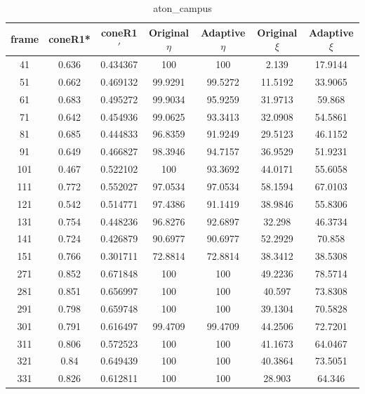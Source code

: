 \begin{appendices}
\begin{table}
\centering
\caption{aton\_campus}
\begin{tabular}{ |c|c|c|c|c|c|c| }
\hline
\textbf{frame} &  \textbf{coneR1*} &  \textbf{coneR1$'$} &  \textbf{Original $\eta$} &  \textbf{Adaptive $\eta$} &  \textbf{Original $\xi$} &  \textbf{Adaptive $\xi$} \\
\hline
\hline
41 &  0.636 &  0.434367 &  100 &  100 &  2.139 &  17.9144 \\
\hline
51 &  0.662 &  0.469132 &  99.9291 &  99.5272 &  11.5192 &  33.9065 \\
\hline
61 &  0.683 &  0.495272 &  99.9034 &  95.9259 &  31.9713 &  59.868 \\
\hline
71 &  0.642 &  0.454936 &  99.0625 &  93.3413 &  32.0908 &  54.5861 \\
\hline
81 &  0.685 &  0.444833 &  96.8359 &  91.9249 &  29.5123 &  46.1152 \\
\hline
91 &  0.649 &  0.466827 &  98.3946 &  94.7157 &  36.9529 &  51.9231 \\
\hline
101 &  0.467 &  0.522102 &  100 &  93.3692 &  44.0171 &  55.6058 \\
\hline
111 &  0.772 &  0.552027 &  97.0534 &  97.0534 &  58.1594 &  67.0103 \\
\hline
121 &  0.542 &  0.514771 &  97.4386 &  91.1419 &  38.9846 &  55.8306 \\
\hline
131 &  0.754 &  0.448236 &  96.8276 &  92.6897 &  32.298 &  46.3734 \\
\hline
141 &  0.724 &  0.426879 &  90.6977 &  90.6977 &  52.2929 &  70.858 \\
\hline
151 &  0.766 &  0.301711 &  72.8814 &  72.8814 &  38.3412 &  38.5308 \\
\hline
271 &  0.852 &  0.671848 &  100 &  100 &  49.2236 &  78.5714 \\
\hline
281 &  0.851 &  0.656997 &  100 &  100 &  40.597 &  73.8308 \\
\hline
291 &  0.798 &  0.659748 &  100 &  100 &  39.1304 &  70.5828 \\
\hline
301 &  0.791 &  0.616497 &  99.4709 &  99.4709 &  44.2506 &  72.7201 \\
\hline
311 &  0.806 &  0.572523 &  100 &  100 &  41.1673 &  64.0467 \\
\hline
321 &  0.84 &  0.649439 &  100 &  100 &  40.3864 &  73.5051 \\
\hline
331 &  0.826 &  0.612811 &  100 &  100 &  28.903 &  64.346 \\

\end{tabular}
\end{table}
\end{appendices}
